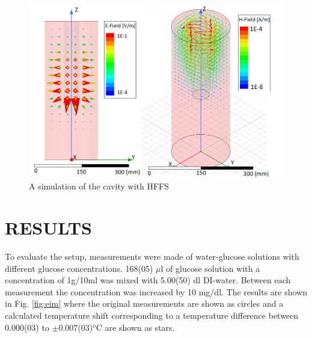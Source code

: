 \documentclass[10pt,final,conference,a4paper,twocolumn]{IEEEtran_AntennEMB_GigaHertz2016}
\begin{document}
\begin{figure}[b]
 	\centering
 	\includegraphics[width=1.0\columnwidth]{EHfield.png}
 	\caption{A simulation of the cavity with HFFS}
 	\label{fig:sim}
 \end{figure}
\section{RESULTS}
To evaluate the setup, measurements were made of water-glucose solutions with different glucose concentrations. 168(05) $\mu$l of glucose solution with a concentration of 1g/10ml was mixed with 5.00(50) dl DI-water. Between each measurement the concentration was increased by 10 mg/dl. The results are shown in Fig. \ref{fig:eim} where the original measurements are shown as circles and a calculated temperature shift corresponding to a temperature difference between 0.000(03) to $\pm$0.007(03)$^o$C are shown as stars.
\end{document}
